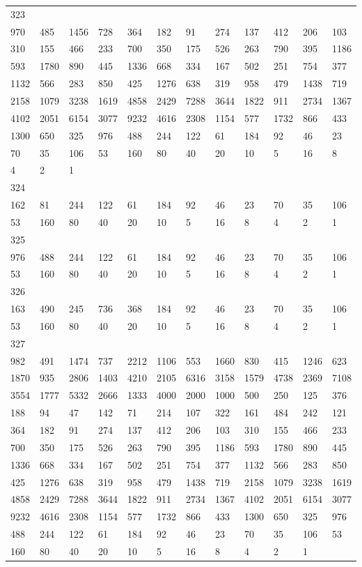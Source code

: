 \begin{longtable}{llllllllllll}
323&&&&&&&&&&&\\
970& 485& 1456& 728& 364& 182& 91& 274& 137& 412& 206& 103\\
310& 155& 466& 233& 700& 350& 175& 526& 263& 790& 395& 1186\\
593& 1780& 890& 445& 1336& 668& 334& 167& 502& 251& 754& 377\\
1132& 566& 283& 850& 425& 1276& 638& 319& 958& 479& 1438& 719\\
2158& 1079& 3238& 1619& 4858& 2429& 7288& 3644& 1822& 911& 2734& 1367\\
4102& 2051& 6154& 3077& 9232& 4616& 2308& 1154& 577& 1732& 866& 433\\
1300& 650& 325& 976& 488& 244& 122& 61& 184& 92& 46& 23\\
70& 35& 106& 53& 160& 80& 40& 20& 10& 5& 16& 8\\
4& 2& 1& \\

324&&&&&&&&&&&\\
162& 81& 244& 122& 61& 184& 92& 46& 23& 70& 35& 106\\
53& 160& 80& 40& 20& 10& 5& 16& 8& 4& 2& 1\\

325&&&&&&&&&&&\\
976& 488& 244& 122& 61& 184& 92& 46& 23& 70& 35& 106\\
53& 160& 80& 40& 20& 10& 5& 16& 8& 4& 2& 1\\

326&&&&&&&&&&&\\
163& 490& 245& 736& 368& 184& 92& 46& 23& 70& 35& 106\\
53& 160& 80& 40& 20& 10& 5& 16& 8& 4& 2& 1\\

327&&&&&&&&&&&\\
982& 491& 1474& 737& 2212& 1106& 553& 1660& 830& 415& 1246& 623\\
1870& 935& 2806& 1403& 4210& 2105& 6316& 3158& 1579& 4738& 2369& 7108\\
3554& 1777& 5332& 2666& 1333& 4000& 2000& 1000& 500& 250& 125& 376\\
188& 94& 47& 142& 71& 214& 107& 322& 161& 484& 242& 121\\
364& 182& 91& 274& 137& 412& 206& 103& 310& 155& 466& 233\\
700& 350& 175& 526& 263& 790& 395& 1186& 593& 1780& 890& 445\\
1336& 668& 334& 167& 502& 251& 754& 377& 1132& 566& 283& 850\\
425& 1276& 638& 319& 958& 479& 1438& 719& 2158& 1079& 3238& 1619\\
4858& 2429& 7288& 3644& 1822& 911& 2734& 1367& 4102& 2051& 6154& 3077\\
9232& 4616& 2308& 1154& 577& 1732& 866& 433& 1300& 650& 325& 976\\
488& 244& 122& 61& 184& 92& 46& 23& 70& 35& 106& 53\\
160& 80& 40& 20& 10& 5& 16& 8& 4& 2& 1& \\


\end{longtable}

